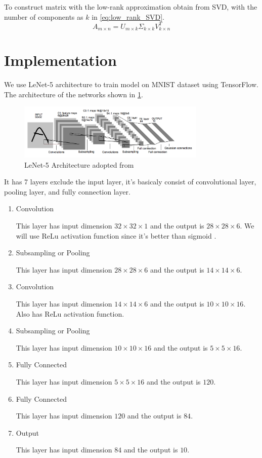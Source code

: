 \documentclass[conference]{IEEEtran}
\begin{document}
To construct matrix with the low-rank approximation obtain from SVD, with the number of components as $k$ in \ref{eq:low_rank_SVD}.
\begin{equation}
    \label{eq:low_rank_SVD}
    A_{m \times n} = U_{m\times k} \Sigma_{k\times k} V_{k\times n}^T 
\end{equation}


\section{Implementation}
We use LeNet-5 architecture to train model on MNIST dataset using TensorFlow. The architecture of the networks shown in \ref{fig:lenet-5archi}.
\begin{figure}[htbp]
    \centerline{\includegraphics[width=9cm]{LeNet-5Architecture.png}}
    \caption{LeNet-5 Architecture adopted from \protect\cite{lenet-5} }
    \label{fig:lenet-5archi}
\end{figure}
It has 7 layers exclude the input layer, it's basicaly consist of convolutional layer, pooling layer, and fully connection layer.
\begin{enumerate}
    \item Convolution

    This layer has input dimension $32 \times 32 \times 1$ and the output is $28 \times 28 \times 6$.
    We will use ReLu activation function since it's better than sigmoid \cite{wang2020improvement}.

    \item Subsampling or Pooling 
    
    This layer has input dimension $28 \times 28 \times 6$ and the output is $14 \times 14 \times 6$.

    \item Convolution
    
    This layer has input dimension $14 \times 14 \times 6$ and the output is $10 \times 10 \times 16$. Also has ReLu activation function.

    \item Subsampling or Pooling 
    
    This layer has input dimension $10 \times 10 \times 16$ and the output is $5 \times 5 \times 16$.

    \item Fully Connected
    
    This layer has input dimension $5 \times 5 \times 16$ and the output is $120$.

    \item Fully Connected
    
    This layer has input dimension $120$ and the output is $84$.

    \item Output  
    
    This layer has input dimension $84$ and the output is $10$.

\end{enumerate}
\end{document}
